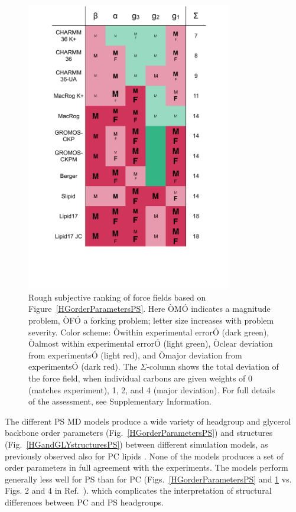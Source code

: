 \documentclass[aps,prl,superscriptaddress,twocolumn]{revtex4}
\begin{document}
\begin{figure}[]
  \centering
  \includegraphics[width=9.0cm]{../Figs/comparisonTablePS.pdf}
  \caption{\label{comparisonTablePS}
    Rough subjective ranking of force fields based on Figure~\ref{HGorderParametersPS}.
    Here ÒMÓ indicates a magnitude problem, ÒFÓ a forking problem; letter size increases with problem severity. Color scheme: Òwithin experimental errorÓ (dark green), Òalmost within experimental errorÓ (light green), Òclear deviation from experimentsÓ (light red), and Òmajor deviation from experimentsÓ (dark red). The $\Sigma$-column shows the total deviation of the force field, when individual carbons are given weights of 0 (matches experiment), 1, 2, and 4 (major deviation). For full details of the assessment, see Supplementary Information.
  }
\end{figure}

The different PS MD models produce a wide variety of headgroup and glycerol backbone order parameters (Fig.~\ref{HGorderParametersPS})
and structures (Fig.~\ref{HGandGLYstructuresPS}) between different simulation models,
as previously observed also for PC lipids \cite{botan15}. None of the models produces a set of order parameters in full agreement with the experiments.
The models perform generally less well for PS than for PC
(Figs.~\ref{HGorderParametersPS} and \ref{comparisonTablePS} vs. Figs. 2 and 4 in Ref.~\cite{botan15}).
which complicates the interpretation of structural differences between PC and PS headgroups.
\end{document}
